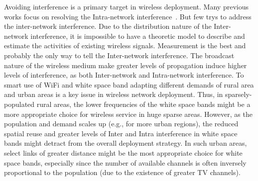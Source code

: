 Avoiding interference is a primary target in wireless deployment.
Many previous works focus on resolving the Intra-network 
interference~\cite{subramanian2008minimum,ramachandran2006interference,si2010overview}.
But few trys to address the inter-network interference.
Due to the distribution nature of the Inter-network interference,
it is impossible to have a theoretic model to describe and estimate the activities of existing
 wireless signals. Measurement is the best and probably the only way to tell the Inter-network
interference. The broadcast nature of the wireless medium make greater levels of propagation 
induce higher levels of interference, as both Inter-network and Intra-network interference. 
To smart use of WiFi and white space band adapting different 
demands of rural area and urban areas is a key issue in wireless network deployment. 
Thus, in sparsely-populated rural areas, the lower frequencies of the white space 
bands might be a more appropriate choice for wireless service in huge sparse areas. 
However, as the population and demand scales up (e.g., 
for more urban regions), the reduced spatial reuse and greater levels of 
Inter and Intra interference in white space bands might detract from the 
overall deployment strategy. In such urban areas, select links of greater 
distance might be the most appropriate choice for white space bands, 
especially since the number of available channels is often inversely 
proportional to the population (due to the existence of greater TV channels).

